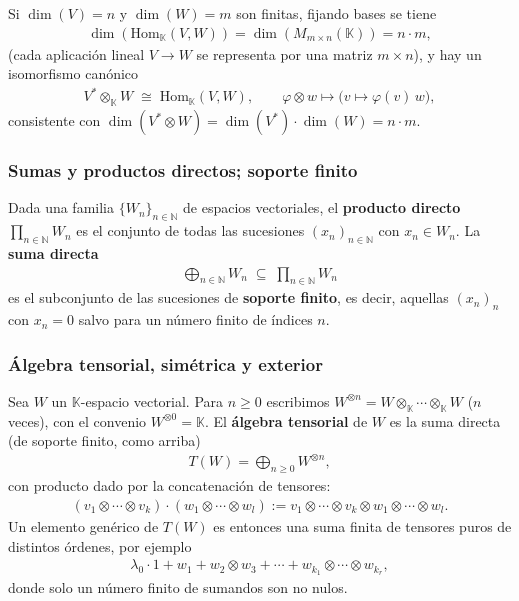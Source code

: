 Si $\dim(V)=n$ y $\dim(W)=m$ son finitas, fijando bases se tiene
\begin{gather*}
    \dim(\mathrm{Hom}_{\mathbb{K}}(V,W)) = \dim(M_{m\times n}(\mathbb{K})) = n\cdot m,
\end{gather*}
(cada aplicación lineal $V\to W$ se representa por una matriz $m\times n$), y hay un isomorfismo canónico
\begin{gather*}
    V^* \otimes_{\mathbb{K}} W \;\cong\; \mathrm{Hom}_{\mathbb{K}}(V,W), \qquad \varphi \otimes w \mapsto \big(v\mapsto \varphi(v)\, w\big),
\end{gather*}
consistente con $\dim(V^*\otimes W) = \dim(V^*)\cdot \dim(W) = n\cdot m$.

\subsubsection{Sumas y productos directos; soporte finito}

Dada una familia $\{W_n\}_{n\in \mathbb{N}}$ de espacios vectoriales, el \textbf{producto directo} $\prod_{n\in \mathbb{N}} W_n$ es el conjunto de todas las sucesiones $(x_n)_{n\in \mathbb{N}}$ con $x_n\in W_n$. La \textbf{suma directa}
\begin{gather*}
    \bigoplus_{n\in \mathbb{N}} W_n \;\subseteq\; \prod_{n\in \mathbb{N}} W_n
\end{gather*}
es el subconjunto de las sucesiones de \textbf{soporte finito}, es decir, aquellas $(x_n)_n$ con $x_n=0$ salvo para un número finito de índices $n$.

\subsubsection{Álgebra tensorial, simétrica y exterior}

Sea $W$ un $\mathbb{K}$-espacio vectorial. Para $n\geq 0$ escribimos $W^{\otimes n} = W\otimes_{\mathbb{K}} \cdots \otimes_{\mathbb{K}} W$ ($n$ veces), con el convenio $W^{\otimes 0}=\mathbb{K}$. El \textbf{álgebra tensorial} de $W$ es la suma directa (de soporte finito, como arriba)
\begin{gather*}
    T(W) = \bigoplus_{n\geq 0} W^{\otimes n},
\end{gather*}
con producto dado por la concatenación de tensores:
\begin{gather*}
    (v_1\otimes\cdots\otimes v_k)\cdot (w_1\otimes \cdots \otimes w_l) := v_1\otimes\cdots\otimes v_k \otimes w_1 \otimes\cdots\otimes w_l.
\end{gather*}
Un elemento genérico de $T(W)$ es entonces una suma finita de tensores puros de distintos órdenes, por ejemplo
\begin{gather*}
    \lambda_0 \cdot 1 + w_1 + w_2\otimes w_3 + \cdots + w_{k_1}\otimes \cdots \otimes w_{k_r} ,
\end{gather*}
donde solo un número finito de sumandos son no nulos.

